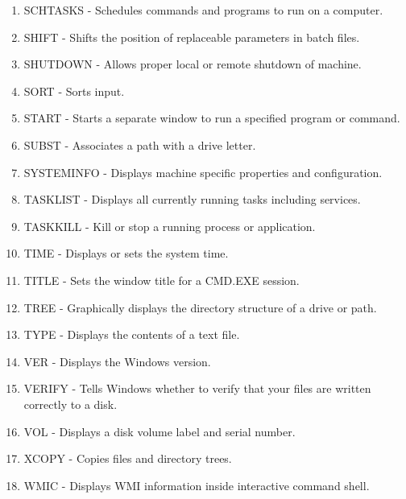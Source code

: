 \documentclass[11pt,a4paper,twoside]{article}
\begin{document}
\begin{enumerate}
\item SCHTASKS       	-	Schedules commands and programs to run on a computer.
\item SHIFT          	-	Shifts the position of replaceable parameters in batch files.
\item SHUTDOWN       	-	Allows proper local or remote shutdown of machine.
\item SORT           	-	Sorts input.
\item START          	-	Starts a separate window to run a specified program or command.
\item SUBST          	-	Associates a path with a drive letter.
\item SYSTEMINFO     	-	Displays machine specific properties and configuration.
\item TASKLIST       	-	Displays all currently running tasks including services.
\item TASKKILL       	-	Kill or stop a running process or application.
\item TIME           	-	Displays or sets the system time.
\item TITLE          	-	Sets the window title for a CMD.EXE session.
\item TREE           	-	Graphically displays the directory structure of a drive or path.
\item TYPE           	-	Displays the contents of a text file.
\item VER            	-	Displays the Windows version.
\item VERIFY         	-	Tells Windows whether to verify that your files are written correctly to a disk.
\item VOL            	-	Displays a disk volume label and serial number.
\item XCOPY          	-	Copies files and directory trees.
\item WMIC           	-	Displays WMI information inside interactive command shell.
\end{enumerate}		
\end{document}
